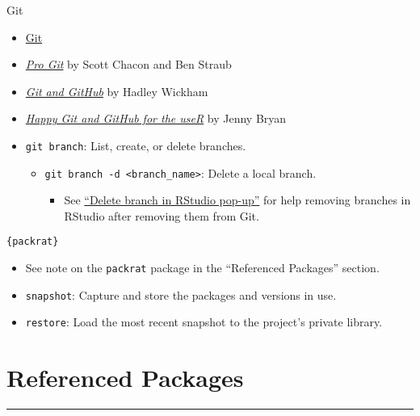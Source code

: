 \documentclass[]{book}
\providecommand{\tightlist}{%
  \setlength{\itemsep}{0pt}\setlength{\parskip}{0pt}}
\begin{document}
Git

\begin{itemize}
\item
  \href{https://git-scm.com/}{Git}
\item
  \href{https://git-scm.com/book/en/v2}{\emph{Pro Git}} by Scott Chacon and Ben Straub
\item
  \href{http://r-pkgs.had.co.nz/git.html\#git-learning}{\emph{Git and GitHub}} by Hadley Wickham
\item
  \href{http://happygitwithr.com/}{\emph{Happy Git and GitHub for the useR}} by Jenny Bryan
\item
  \texttt{git\ branch}: List, create, or delete branches.

  \begin{itemize}
  \tightlist
  \item
    \texttt{git\ branch\ -d\ \textless{}branch\_name\textgreater{}}: Delete a local branch.

    \begin{itemize}
    \tightlist
    \item
      See \href{https://community.rstudio.com/t/delete-branch-in-rstudio-pop-up/15465}{``Delete branch in RStudio pop-up''} for help removing branches in RStudio after removing them from Git.
    \end{itemize}
  \end{itemize}
\end{itemize}

\texttt{\{packrat\}}

\begin{itemize}
\tightlist
\item
  See note on the \texttt{packrat} package in the ``Referenced Packages'' section.
\item
  \texttt{snapshot}: Capture and store the packages and versions in use.
\item
  \texttt{restore}: Load the most recent snapshot to the project's private library.
\end{itemize}

\hypertarget{referenced-packages}{%
\chapter{Referenced Packages}\label{referenced-packages}}

\begin{center}\rule{0.5\linewidth}{\linethickness}\end{center}
\end{document}
